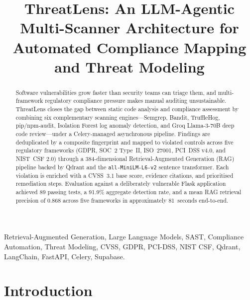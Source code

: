 \documentclass[conference]{IEEEtran}
\begin{document}
\title{ThreatLens: An LLM-Agentic Multi-Scanner Architecture for
       Automated Compliance Mapping and Threat Modeling}

\author{%
}
\maketitle

\begin{abstract}
Software vulnerabilities grow faster than security teams can triage them,
and multi-framework regulatory compliance pressure makes manual auditing
unsustainable. ThreatLens closes the gap between static code analysis and
compliance assessment by combining six complementary scanning
engines---Semgrep, Bandit, TruffleHog, pip/npm-audit, Isolation Forest
log anomaly detection, and Groq Llama-3-70B deep code review---under a
Celery-managed asynchronous pipeline. Findings are deduplicated by a
composite fingerprint and mapped to violated controls across five
regulatory frameworks (GDPR, SOC~2 Type~II, ISO~27001, PCI~DSS v4.0, and
NIST~CSF 2.0) through a 384-dimensional Retrieval-Augmented Generation
(RAG) pipeline backed by Qdrant and the \texttt{all-MiniLM-L6-v2}
sentence transformer. Each violation is enriched with a CVSS~3.1 base
score, evidence citations, and prioritised remediation steps.
Evaluation against a deliberately vulnerable Flask application achieved
89 passing tests, a 91.9\% aggregate detection rate, and a mean RAG
retrieval precision of 0.868 across five frameworks in approximately
81~seconds end-to-end.
\end{abstract}

\begin{IEEEkeywords}
Retrieval-Augmented Generation, Large Language Models, SAST, Compliance
Automation, Threat Modeling, CVSS, GDPR, PCI-DSS, NIST CSF, Qdrant,
LangChain, FastAPI, Celery, Supabase.
\end{IEEEkeywords}

\section{Introduction}
\label{sec:intro}
\end{document}
